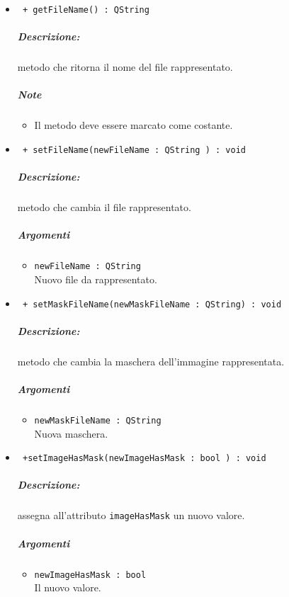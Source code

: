 \begin{itemize}
	\item \color{blue}\verb! + getFileName() : QString!\\
	\color{black}
	\subparagraph{Descrizione:} metodo che ritorna il nome del file rappresentato.
	\subparagraph{Note}
		\begin{itemize}
			\item Il metodo deve essere marcato come costante.
		\end{itemize}
	
	\item \color{blue}\verb! + setFileName(newFileName : QString ) : void!\\
	\color{black}
	\subparagraph{Descrizione:} metodo che cambia il file rappresentato.
	\subparagraph{Argomenti}
		\begin{itemize}
			\item \color{RoyalPurple}\verb!newFileName : QString !\\
			\color{black}Nuovo file da rappresentato.
		\end{itemize}
		
	\item \color{blue}\verb! + setMaskFileName(newMaskFileName : QString) : void!\\
	\color{black}
	\subparagraph{Descrizione:} metodo che cambia la maschera\g{} dell'immagine rappresentata.
	\subparagraph{Argomenti}
		\begin{itemize}
			\item \color{RoyalPurple}\verb!newMaskFileName : QString!\\
			\color{black}Nuova maschera.
		\end{itemize}
	  
	 \item \color{blue}\verb! +setImageHasMask(newImageHasMask : bool ) : void!\\
	  \color{black}
	  \subparagraph{Descrizione:} assegna all'attributo \verb!imageHasMask! un nuovo valore.
	  \subparagraph{Argomenti}
	  	\begin{itemize}
		  	\item \color{RoyalPurple}\verb!newImageHasMask : bool!\\
		  	\color{black}Il nuovo valore.
	  	\end{itemize}
	
	\end{itemize}

\pagebreak
